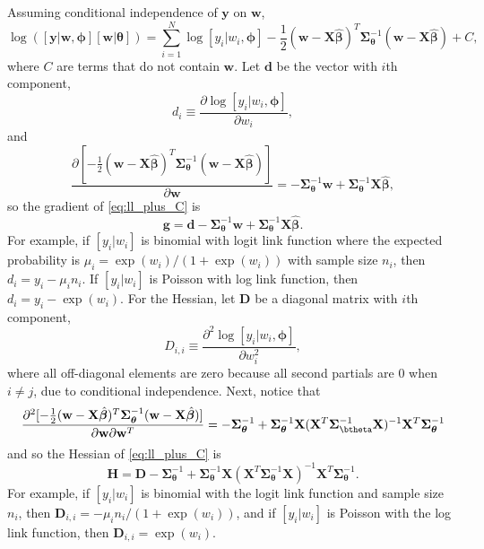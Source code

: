 \documentclass[12pt, titlepage]{article}
\begin{document}
Assuming conditional independence of $\mathbf{y}$ on $\mathbf{w}$,
\begin{equation} \label{eq:ll_plus_C}
\log([\mathbf{y}|\mathbf{w},\boldsymbol{\phi}][\mathbf{w}|\boldsymbol{\theta}]) = \sum_{i = 1}^N \log[y_i|w_i,\boldsymbol{\phi}] - \frac{1}{2}(\mathbf{w} - \mathbf{X}\hat{\boldsymbol{\beta}})^{T}\boldsymbol{\Sigma}_{\boldsymbol{\theta}}^{-1}(\mathbf{w} - \mathbf{X}\hat{\boldsymbol{\beta}}) + C,
\end{equation}
where $C$ are terms that do not contain $\mathbf{w}$. Let $\mathbf{d}$ be the vector with $i$th component,
$$
d_{i} \equiv \frac{\partial\log[y_i|w_i,\boldsymbol{\phi}]}{\partial w_i},
$$
and
$$
\frac{\partial [-\frac{1}{2}(\mathbf{w} - \mathbf{X}\hat{\boldsymbol{\beta}})^{T}\boldsymbol{\Sigma}_{\boldsymbol{\theta}}^{-1}(\mathbf{w} - \mathbf{X}\hat{\boldsymbol{\beta}})]}{\partial \mathbf{w}} = -\boldsymbol{\Sigma}_{\boldsymbol{\theta}}^{-1}\mathbf{w} + \boldsymbol{\Sigma}_{\boldsymbol{\theta}}^{-1}\boldsymbol{X}\hat{\boldsymbol{\beta}},
$$
so the gradient of \eqref{eq:ll_plus_C} is
$$
\mathbf{g} = \mathbf{d} - \boldsymbol{\Sigma}_{\boldsymbol{\theta}}^{-1}\mathbf{w} + \boldsymbol{\Sigma}_{\boldsymbol{\theta}}^{-1}\mathbf{X}\hat{\boldsymbol{\beta}}.
$$
For example, if $[y_i|w_i]$ is binomial with logit link function where the expected probability is $\mu_{i} = \exp(w_{i})/(1 + \exp(w_{i}))$ with sample size $n_{i}$, then $d_{i} = y_i - \mu_{i}n_i$.  If $[y_i|w_i]$ is Poisson with log link function, then $d_{i} = y_{i} - \exp(w_{i})$. For the Hessian, let $\mathbf{D}$ be a diagonal matrix with $i$th component,
$$
D_{i,i} \equiv \frac{\partial^2\log[y_i|w_i,\boldsymbol{\phi}]}{\partial w_i^2},
$$
where all off-diagonal elements are zero because all second partials are 0 when $i \neq j$, due to conditional independence. Next, notice that
$$
\frac{\partial^2 [-\frac{1}{2}(\mathbf{w} - \mathbf{X}\hat{\boldsymbol{\beta}})^{T}\boldsymbol{\Sigma}_{\boldsymbol{\theta}}^{-1}(\mathbf{w} - \mathbf{X}\hat{\boldsymbol{\beta}})] }{\partial \mathbf{w} \partial \mathbf{w}^{T}} =
	-\boldsymbol{\Sigma}_{\boldsymbol{\theta}}^{-1} + \boldsymbol{\Sigma}_{\boldsymbol{\theta}}^{-1}\mathbf{X}(\mathbf{X}^{T}\boldsymbol{\Sigma}_{\boldsymbol{\btheta}}^{-1}\mathbf{X})^{-1}\mathbf{X}^{T}\boldsymbol{\Sigma}_{\boldsymbol{\theta}}^{-1}
$$
and so the Hessian of \eqref{eq:ll_plus_C} is
\begin{equation} \label{eq:Hdef}
\mathbf{H} = \mathbf{D} -\boldsymbol{\Sigma}_{\boldsymbol{\theta}}^{-1} + 
	\boldsymbol{\Sigma}_{\boldsymbol{\theta}}^{-1}\mathbf{X}(\mathbf{X}^{T}\boldsymbol{\Sigma}_{\boldsymbol{\theta}}^{-1}\mathbf{X})^{-1}\mathbf{X}^{T}\boldsymbol{\Sigma}_{\boldsymbol{\theta}}^{-1}.
\end{equation}
For example, if $[y_i|w_i]$ is binomial with the logit link function and sample size $n_{i}$, then $\mathbf{D}_{i,i} = -\mu_i n_i/(1 + \exp(w_i))$, and if $[y_i|w_i]$ is Poisson with the log link function, then $\mathbf{D}_{i,i} = \exp(w_i)$.
\end{document}
